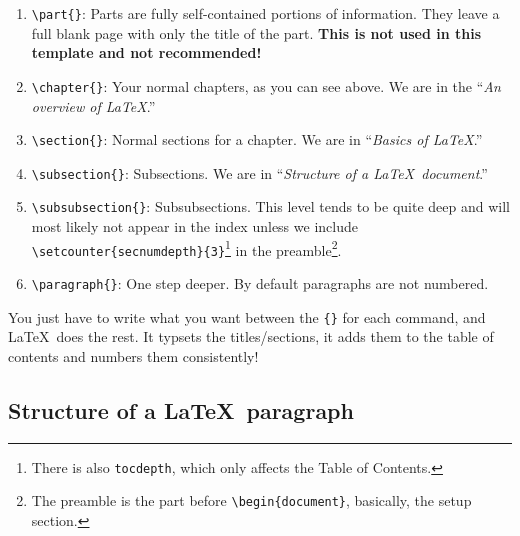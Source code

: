 \begin{enumerate}
	\item \verb|\part{}|: Parts are fully self-contained portions of information. They leave a full blank page with only the title of the part. \textbf{This is not used in this template and not recommended!}
	\item \verb|\chapter{}|: Your normal chapters, as you can see above. We are in the ``\emph{An overview of \LaTeX }.''
	\item \verb|\section{}|: Normal sections for a chapter. We are in ``\emph{Basics of \LaTeX}.''
	\item \verb|\subsection{}|: Subsections. We are in ``\emph{Structure of a \LaTeX\ document}.''
	\item \verb|\subsubsection{}|: Subsubsections. This level tends to be quite deep and will most likely not appear in the index unless we include \verb|\setcounter{secnumdepth}{3}|\footnote{There is also \texttt{tocdepth}, which only affects the Table of Contents.} in the preamble\footnote{The preamble is the part before \texttt{\textbackslash begin\{document\}}, basically, the setup section.}.
	\item \verb|\paragraph{}|: One step deeper. By default paragraphs are not numbered.
\end{enumerate}

You just have to write what you want between the \verb|{}| for each command, and \LaTeX\ does the rest. It typsets the titles/sections, it adds them to the table of contents and numbers them consistently!

\subsection{Structure of a \LaTeX\ paragraph}

